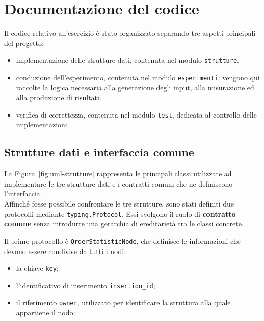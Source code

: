 \documentclass[a4paper,11pt]{article}
\begin{document}
\clearpage
\section{Documentazione del codice}
Il codice relativo all'esercizio è stato organizzato separando tre aspetti principali del progetto: 
\begin{itemize}
    \item implementazione delle strutture dati, contenuta nel modulo \texttt{strutture}.
    
    \item conduzione dell'esperimento, contenuta nel modulo \texttt{esperimenti}: vengono qui raccolte la logica necessaria alla generazione degli input, alla misurazione ed alla produzione di risultati.
    
    \item verifica di correttezza, contenuta nel modulo \texttt{test}, dedicata al controllo delle implementazioni.
\end{itemize}


\subsection{Strutture dati e interfaccia comune} 
La Figura~\ref{fig:uml-strutture} rappresenta le principali classi utilizzate ad implementare le tre strutture dati e i contratti comuni che ne definiscono l'interfaccia.\\
Affinché fosse possibile confrontare le tre strutture, sono stati definiti due protocolli mediante \texttt{typing.Protocol}. Essi svolgono il ruolo di \textbf{contratto comune} senza introdurre una gerarchia di ereditarietà tra le classi concrete.

Il primo protocollo è \texttt{OrderStatisticNode}, che definisce le informazioni che devono essere condivise da tutti i nodi: 
\begin{itemize}
    \item la chiave \texttt{key};

    \item l'identificativo di inserimento \texttt{insertion\_id};
    
    \item il riferimento \texttt{owner}, utilizzato per identificare la struttura alla quale appartiene il nodo;
\end{itemize}
\end{document}
